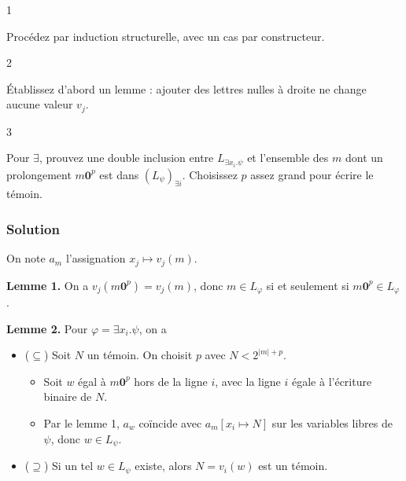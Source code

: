 \documentclass[11pt,a4paper]{article}
\providecommand{\tightlist}{\setlength{\itemsep}{0pt}\setlength{\parskip}{0pt}}
\newcommand{\equationajustee}[1]{%
  \sbox{\boiteequation}{$\displaystyle #1$}%
  \ifdim\wd\boiteequation>\linewidth
    \[\resizebox{\linewidth}{!}{\usebox{\boiteequation}}\]%
  \else
    \[#1\]%
  \fi}
\begin{document}
\begin{indication}{1}

Procédez par induction structurelle, avec un cas par constructeur.

\end{indication}

\begin{indication}{2}

Établissez d'abord un lemme : ajouter des lettres nulles à droite ne change aucune valeur \(v_j\).

\end{indication}

\begin{indication}{3}

Pour \(\exists\), prouvez une double inclusion entre \(L_{\exists x_i.\psi}\) et l'ensemble des \(m\) dont un prolongement \(m{\mathbf{0}}^p\) est dans \((L_\psi)_{\exists i}\). Choisissez \(p\) assez grand pour écrire le témoin.

\end{indication}

\hypertarget{solution-28}{%
\subsubsection{Solution}\label{solution-28}}

On note \(a_m\) l'assignation \(x_j\mapsto v_j(m)\).

\textbf{Lemme 1.} On a \(v_j(m{\mathbf{0}}^p)=v_j(m)\), donc \(m\in L_\varphi\) si et seulement si \(m{\mathbf{0}}^p\in L_\varphi\).

\textbf{Lemme 2.} Pour \(\varphi=\exists x_i.\psi\), on a
\equationajustee{L_\varphi=\{m:\exists p,\ m{\mathbf{0}}^p\in(L_\psi)_{\exists i}\}.}

\begin{itemize}
\tightlist
\item
  (\(\subseteq\)) Soit \(N\) un témoin. On choisit \(p\) avec \(N<2^{\lvert m\rvert+p}\).

  \begin{itemize}
  \tightlist
  \item
    Soit \(w\) égal à \(m{\mathbf{0}}^p\) hors de la ligne \(i\), avec la ligne \(i\) égale à l'écriture binaire de \(N\).
  \item
    Par le lemme 1, \(a_w\) coïncide avec \(a_m[x_i\mapsto N]\) sur les variables libres de \(\psi\), donc \(w\in L_\psi\).
  \end{itemize}
\item
  (\(\supseteq\)) Si un tel \(w\in L_\psi\) existe, alors \(N=v_i(w)\) est un témoin.
\end{itemize}
\end{document}
